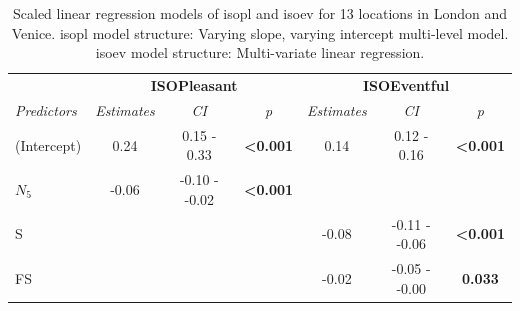    \begin{table}[h!]
  \centering
\caption{Scaled linear regression models of \gls{isopl} and \gls{isoev} for 13 locations in London and Venice. \gls{isopl} model structure: Varying slope, varying intercept multi-level model. \gls{isoev} model structure: Multi-variate linear regression. \label{tab:scaled-model}}

  \def\arraystretch{.5}
  \begin{tabular}{@{}l|lccccc@{}}
    \toprule
    \multicolumn{1}{l|}{}                    &
    \multicolumn{3}{c}{\textbf{ISOPleasant}} &
    \multicolumn{3}{c}{\textbf{ISOEventful}}                                                                                                                                                           \\
    \textit{Predictors}                      &
    \multicolumn{1}{c}{\textit{Estimates}}   &
    \textit{CI}                              &
    \textit{p}                               &
    \textit{Estimates}                       &
    \textit{CI}                              &
    \textit{p}                                                                                                                                                                                         \\ \midrule
    (Intercept)                              &
    \multicolumn{1}{c}{0.24}                 &
    0.15 - 0.33                              &
    \textbf{\textless{}0.001}                &
    0.14                                     &
    0.12 - 0.16                              &
    \textbf{\textless{}0.001}                                                                                                                                                                          \\
    $N_5$                                    & \multicolumn{1}{c}{-0.06}                               & -0.10 - -0.02 & \textbf{\textless{}0.001} &       &               &                           \\
    S                                        & \multicolumn{1}{c}{}                                    &               &                           & -0.08 & -0.11 - -0.06 & \textbf{\textless{}0.001} \\
    FS                                       & \multicolumn{1}{c}{}                                    &               &                           & -0.02 & -0.05 - -0.00 & \textbf{0.033}            \\

\end{tabular}
\end{table}
